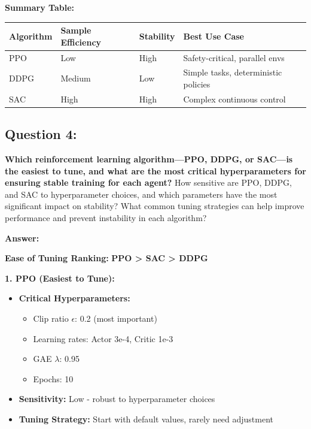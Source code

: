 \documentclass[12pt]{article}
\begin{document}
{{{\textbf{Summary Table:}
\begin{table}[h]
\centering
\begin{tabular}{|l|l|l|l|}
\hline
\textbf{Algorithm} & \textbf{Sample Efficiency} & \textbf{Stability} & \textbf{Best Use Case} \\
\hline
PPO & Low & High & Safety-critical, parallel envs \\
DDPG & Medium & Low & Simple tasks, deterministic policies \\
SAC & High & High & Complex continuous control \\
\hline
\end{tabular}
\end{table}

\subsection{Question 4:}
\textbf{Which reinforcement learning algorithm—PPO, DDPG, or SAC—is the easiest to tune, and what are the most critical hyperparameters for ensuring stable training for each agent?}
\newline
How sensitive are PPO, DDPG, and SAC to hyperparameter choices, and which parameters have the most significant impact on stability?
What common tuning strategies can help improve performance and prevent instability in each algorithm?

\textbf{Answer:}

\textbf{Ease of Tuning Ranking:} \textbf{PPO > SAC > DDPG}

\textbf{1. PPO (Easiest to Tune):}
\begin{itemize}
    \item \textbf{Critical Hyperparameters:}
    \begin{itemize}
        \item Clip ratio $\epsilon$: 0.2 (most important)
        \item Learning rates: Actor 3e-4, Critic 1e-3
        \item GAE $\lambda$: 0.95
        \item Epochs: 10
    \end{itemize}
    \item \textbf{Sensitivity:} Low - robust to hyperparameter choices
    \item \textbf{Tuning Strategy:} Start with default values, rarely need adjustment
\end{itemize}

}}}
\end{document}
